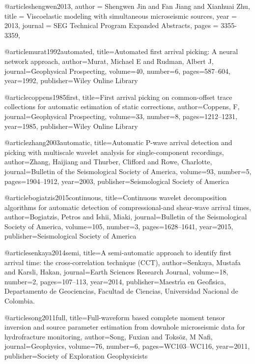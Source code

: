 @article{shengwen2013,
  author =	 {Shengwen Jin and Fan Jiang and Xianhuai Zhu},
  title =	 {Viscoelastic modeling with simultaneous microseismic sources},
  year =	 2013,
  journal =	 {SEG Technical Program Expanded Abstracts},
  pages =	 {3355-3359},
}

@article{murat1992automated,
  title={Automated first arrival picking: A neural network approach},
  author={Murat, Michael E and Rudman, Albert J},
  journal={Geophysical Prospecting},
  volume={40},
  number={6},
  pages={587--604},
  year={1992},
  publisher={Wiley Online Library}
}

@article{coppens1985first,
  title={First arrival picking on common-offset trace collections for automatic estimation of static corrections},
  author={Coppens, F},
  journal={Geophysical Prospecting},
  volume={33},
  number={8},
  pages={1212--1231},
  year={1985},
  publisher={Wiley Online Library}
}

@article{zhang2003automatic,
  title={Automatic P-wave arrival detection and picking with multiscale wavelet analysis for single-component recordings},
  author={Zhang, Haijiang and Thurber, Clifford and Rowe, Charlotte},
  journal={Bulletin of the Seismological Society of America},
  volume={93},
  number={5},
  pages={1904--1912},
  year={2003},
  publisher={Seismological Society of America}
}


@article{bogiatzis2015continuous,
  title={Continuous wavelet decomposition algorithms for automatic detection of compressional-and shear-wave arrival times},
  author={Bogiatzis, Petros and Ishii, Miaki},
  journal={Bulletin of the Seismological Society of America},
  volume={105},
  number={3},
  pages={1628--1641},
  year={2015},
  publisher={Seismological Society of America}
}

@article{senkaya2014semi,
  title={A semi-automatic approach to identify first arrival time: the cross-correlation technique (CCT)},
  author={Senkaya, Mustafa and Karsli, Hakan},
  journal={Earth Sciences Research Journal},
  volume={18},
  number={2},
  pages={107--113},
  year={2014},
  publisher={Maestr{\'\i}a en Geof{\'\i}sica, Departamento de Geociencias, Facultad de Ciencias, Universidad Nacional de Colombia.}
}

@article{song2011full,
  title={Full-waveform based complete moment tensor inversion and source parameter estimation from downhole microseismic data for hydrofracture monitoring},
  author={Song, Fuxian and Toks{\"o}z, M Nafi},
  journal={Geophysics},
  volume={76},
  number={6},
  pages={WC103--WC116},
  year={2011},
  publisher={Society of Exploration Geophysicists}
}

